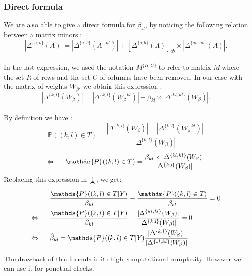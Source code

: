 \documentclass[a4paper,10pt]{article}
\begin{document}
 \subsubsection{Direct formula}
 We are also able to give a direct formula for $\beta_{kl}$, by noticing the following relation between a matrix minors :
 \[|\Delta^{\{a,b\}}(A)|=|\Delta^{\{a,b\}}(A^{- ab})| + [\Delta^{\{a,b\}}(A)]_{ab}\times |\Delta^{\{ab,ab\}}(A)|.\]\\
In the last expression, we used the notation $M^{\{R,C\}}$ to refer to matrix $M$ where the set $R$ of rows and the set $C$ of columns
have been removed. In our case with the matrix of weights $W_\beta$, we obtain this expression :
\[|\Delta^{\{k,l\}}(W_\beta)|=|\Delta^{\{k,l\}}(W_\beta^{- kl})| + \beta_{kl}\times |\Delta^{\{kl,kl\}}(W_\beta)|.\]\\

By definition we have :
\[\mathds{P}((k,l)\in T ) = \frac{|\Delta^{\{k,l\}}(W_\beta)|-|\Delta^{\{k,l\}}(W_\beta^{- kl})|}{|\Delta^{\{k,l\}}(W_\beta)|}\]
\[\Leftrightarrow  \text{\hspace{0.5cm}}\mathds{P}((k,l)\in T ) =\frac{\beta_{kl}\times |\Delta^{\{kl,kl\}}(W_\beta)|}{|\Delta^{\{k,l\}}(W_\beta)|}\]
Replacing this expression in \ref{1}, we get:

\begin{align*}
 &\frac{ \mathds{P}((k,l)\in T | Y)}{\beta_{kl}} -\frac{\mathds{P}((k,l)\in T)}{\beta_{kl}} =0 \\
 \Leftrightarrow \text{\hspace{0.5cm}}& \frac{ \mathds{P}((k,l)\in T | Y)}{\beta_{kl}} -\frac{|\Delta^{\{kl,kl\}}(W_\beta)|}{|\Delta^{\{k,l\}}(W_\beta)|}=0\\
 \Leftrightarrow \text{\hspace{0.5cm}}& \hat{\beta}_{kl} = \mathds{P}((k,l)\in T | Y) \frac{|\Delta^{\{k,l\}}(W_\beta)|}{|\Delta^{\{kl,kl\}}(W_\beta)|}
\end{align*}

The drawback of this formula is its high computational complexity. However we can use it for ponctual checks.
\end{document}
